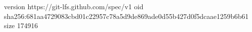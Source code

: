 version https://git-lfs.github.com/spec/v1
oid sha256:681aa4729083cbd01c22957c78a5d9de869ade0d55b427d0f5dcaae1259b6b61
size 174916
